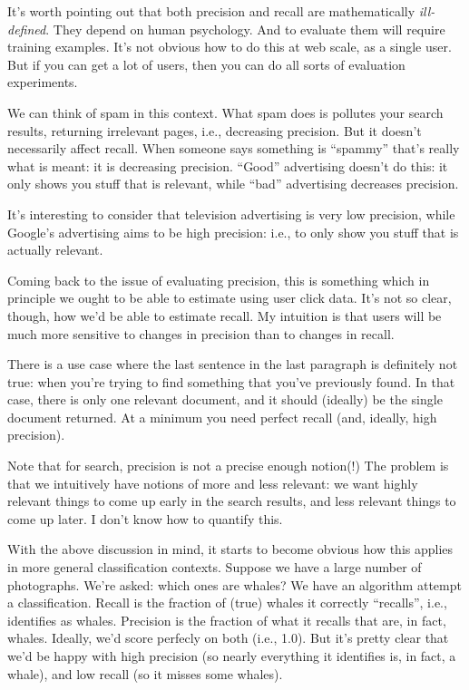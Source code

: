 It's worth pointing out that both precision and recall are
mathematically \emph{ill-defined}.  They depend on human psychology.
And to evaluate them will require training examples.  It's not obvious
how to do this at web scale, as a single user.  But if you can get a
lot of users, then you can do all sorts of evaluation experiments.

We can think of spam in this context.  What spam does is pollutes your
search results, returning irrelevant pages, i.e., decreasing
precision.  But it doesn't necessarily affect recall.  When someone
says something is ``spammy'' that's really what is meant: it is
decreasing precision.  ``Good'' advertising doesn't do this: it only
shows you stuff that is relevant, while ``bad'' advertising decreases
precision.

It's interesting to consider that television advertising is very low
precision, while Google's advertising aims to be high precision: i.e.,
to only show you stuff that is actually relevant.

Coming back to the issue of evaluating precision, this is something
which in principle we ought to be able to estimate using user click
data.  It's not so clear, though, how we'd be able to estimate recall.
My intuition is that users will be much more sensitive to changes in
precision than to changes in recall.  

There is a use case where the last sentence in the last paragraph is
definitely not true: when you're trying to find something that you've
previously found.  In that case, there is only one relevant document,
and it should (ideally) be the single document returned.  At a minimum
you need perfect recall (and, ideally, high precision).

Note that for search, precision is not a precise enough notion(!)
The problem is that we intuitively have notions of more and less
relevant: we want highly relevant things to come up early in the
search results, and less relevant things to come up later.  I don't
know how to quantify this.

With the above discussion in mind, it starts to become obvious how
this applies in more general classification contexts.  Suppose we have
a large number of photographs.  We're asked: which ones are whales?
We have an algorithm attempt a classification.  Recall is the fraction
of (true) whales it correctly ``recalls'', i.e., identifies as whales.
Precision is the fraction of what it recalls that are, in fact,
whales.  Ideally, we'd score perfecly on both (i.e., 1.0).  But it's
pretty clear that we'd be happy with high precision (so nearly
everything it identifies is, in fact, a whale), and low recall (so it
misses some whales).

